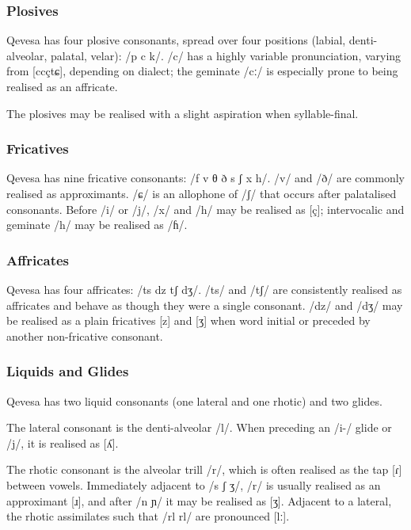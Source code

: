 \documentclass[grammar]{subfiles}
\begin{document}
\subsubsection{Plosives}
\label{sssec:plosives}

Qevesa has four plosive consonants, spread over four positions (labial,
denti-alveolar, palatal, velar): /p  c k/.  /c/ has a highly variable
pronunciation, varying from [c\tlde cç\tlde tɕ], depending on dialect; the geminate /cː/
is especially prone to being realised as an affricate. 

The plosives may be realised with a slight aspiration when syllable-final. 


\subsubsection{Fricatives}
\label{sssec:fricatives}

Qevesa has nine fricative consonants: /f v θ ð s ʃ x h/.  /v/ and /ð/ are
commonly realised as approximants.  /ɕ/ is an allophone of /ʃ/ that occurs
after palatalised consonants.  Before /i/ or /j/, /x/ and /h/ may be realised
as [ç]; intervocalic and geminate /h/ may be realised as /ɦ/. 


\subsubsection{Affricates}
\label{sssec:affricates}

Qevesa has four affricates: /ts dz tʃ dʒ/.  /ts/ and /tʃ/ are consistently
realised as affricates and behave as though they were a single consonant.  /dz/
and /dʒ/ may be realised as a plain fricatives [z] and [ʒ] when word initial or
preceded by another non-fricative consonant.



\subsubsection{Liquids and Glides}
\label{sssec:liquids}

Qevesa has two liquid consonants (one lateral and one rhotic) and two glides.

The lateral consonant is the denti-alveolar /l/.  When preceding an /i-/ glide
or /j/, it is realised as [ʎ].  

The rhotic consonant is the alveolar trill /r/, which is often realised as the
tap [ɾ] between vowels.  Immediately adjacent to /s ʃ ʒ/, /r/ is usually
realised as an approximant [ɹ], and after /n ɲ/ it may be realised as [ʒ].
Adjacent to a lateral, the rhotic assimilates such that /rl rl/ are pronounced
[lː].
\end{document}
